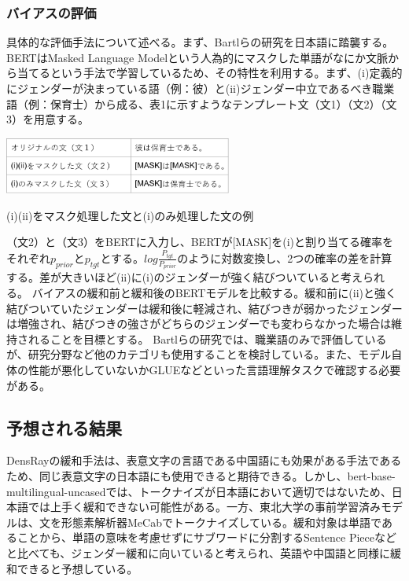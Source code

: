 \documentclass[a4j,10pt, twocolumn]{jarticle} \usepackage[dvipdfmx]{graphicx} \usepackage{amssymb} \usepackage{amsmath}
\begin{document}
\subsubsection{バイアスの評価}
具体的な評価手法について述べる。まず、Bartlらの研究\cite{Bartl}を日本語に踏襲する。BERTはMasked Language Modelという人為的にマスクした単語がなにか文脈から当てるという手法で学習しているため、その特性を利用する。まず、(i)定義的にジェンダーが決まっている語（例：彼）と(ii)ジェンダー中立であるべき職業語（例：保育士）から成る、表1に示すようなテンプレート文（文1）（文2）（文3）を用意する。
\begin{table}[h]
    \centering
    \includegraphics[width=75mm]{./processed_sentence.png}
    \caption{(i)(ii)をマスク処理した文と(i)のみ処理した文の例}
\end{table}

（文2）と（文3）をBERTに入力し、BERTが[MASK]を(i)と割り当てる確率をそれぞれ$p_{prior}$と$p_{tgt}$とする。$log\frac{P_{tgt}}{P_{prior}}$のように対数変換し、2つの確率の差を計算する。差が大きいほど(ii)に(i)のジェンダーが強く結びついていると考えられる。
バイアスの緩和前と緩和後のBERTモデルを比較する。緩和前に(ii)と強く結びついていたジェンダーは緩和後に軽減され、結びつきが弱かったジェンダーは増強され、結びつきの強さがどちらのジェンダーでも変わらなかった場合は維持されることを目標とする。
Bartlらの研究では、職業語のみで評価しているが、研究分野など他のカテゴリも使用することを検討している。また、モデル自体の性能が悪化していないかGLUEなどといった言語理解タスクで確認する必要がある。

\subsection{予想される結果}
DensRayの緩和手法は、表意文字の言語である中国語にも効果がある手法であるため、同じ表意文字の日本語にも使用できると期待できる。しかし、bert-base-multilingual-uncasedでは、トークナイズが日本語において適切ではないため\cite{Aoshima}、日本語では上手く緩和できない可能性がある。一方、東北大学の事前学習済みモデルは、文を形態素解析器MeCabでトークナイズしている。緩和対象は単語であることから、単語の意味を考慮せずにサブワードに分割するSentence Pieceなどと比べても、ジェンダー緩和に向いていると考えられ、英語や中国語と同様に緩和できると予想している。
\end{document}
